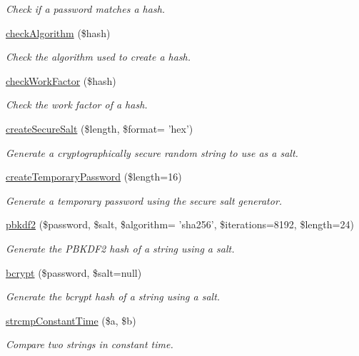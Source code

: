 \begin{DoxyCompactItemize}
\begin{DoxyCompactList}\small\item\em Check if a password matches a hash. \end{DoxyCompactList}\item 
\hyperlink{classPassword_a9bcd6f8ec84385ed4973e4bef05ecbea}{check\-Algorithm} (\$hash)
\begin{DoxyCompactList}\small\item\em Check the algorithm used to create a hash. \end{DoxyCompactList}\item 
\hyperlink{classPassword_aba9bca7cad134de9f4895852523ebec1}{check\-Work\-Factor} (\$hash)
\begin{DoxyCompactList}\small\item\em Check the work factor of a hash. \end{DoxyCompactList}\item 
\hyperlink{classPassword_a76fa768628b67c0f841b2c9acab9d678}{create\-Secure\-Salt} (\$length, \$format= 'hex')
\begin{DoxyCompactList}\small\item\em Generate a cryptographically secure random string to use as a salt. \end{DoxyCompactList}\item 
\hyperlink{classPassword_aef378e672d57dbe203242230c3cc45a9}{create\-Temporary\-Password} (\$length=16)
\begin{DoxyCompactList}\small\item\em Generate a temporary password using the secure salt generator. \end{DoxyCompactList}\item 
\hyperlink{classPassword_ac87ffce0f03ab9b36287a22d1d70162d}{pbkdf2} (\$password, \$salt, \$algorithm= 'sha256', \$iterations=8192, \$length=24)
\begin{DoxyCompactList}\small\item\em Generate the P\-B\-K\-D\-F2 hash of a string using a salt. \end{DoxyCompactList}\item 
\hyperlink{classPassword_a097e73abceaf4b976c92471f9b4a2cab}{bcrypt} (\$password, \$salt=null)
\begin{DoxyCompactList}\small\item\em Generate the bcrypt hash of a string using a salt. \end{DoxyCompactList}\item 
\hyperlink{classPassword_a56edcc9dc50a2dc82886e943de17786b}{strcmp\-Constant\-Time} (\$a, \$b)
\begin{DoxyCompactList}\small\item\em Compare two strings in constant time. \end{DoxyCompactList}\end{DoxyCompactItemize}
